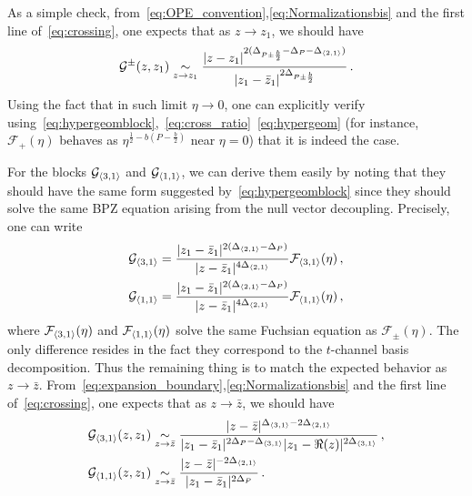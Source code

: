 \documentclass[a4paper]{article}
\begin{document}
As a simple check, from~\eqref{eq:OPE_convention},\eqref{eq:Normalizationsbis} and the first line of~\eqref{eq:crossing}, one expects that as $z \to z_1$, we should have
\begin{equation}
  \mathcal{G}^{\pm}(z,z_1) \underset{z \to z_1}{\sim} \frac{|z-z_1|^{2(\Delta_{P\pm\frac{b}{2}}-\Delta_P -\Delta_{\braket{2,1}})}}{|z_1-\bar{z}_1|^{2\Delta_{P\pm\frac{b}{2}}}}\,.
\end{equation}
Using the fact that in such limit $\eta \to 0$, one can explicitly verify using~\eqref{eq:hypergeomblock},~\eqref{eq:cross_ratio}~\eqref{eq:hypergeom} (for instance, $\mathcal{F}_+(\eta)$ behaves as $\eta^{\frac{1}{2}-b\left(P-\frac{b}{2}\right)}$ near $\eta =0$) that it is indeed the case.

For the blocks $\mathcal{G}_{\braket{3,1}}$ and $\mathcal{G}_{\braket{1,1}}$, we can derive them easily by noting that they should have the same form suggested by~\eqref{eq:hypergeomblock} since they should solve the same BPZ equation arising from the null vector decoupling. Precisely, one can  write
\begin{equation}
  \begin{aligned}
    \mathcal{G}_{\braket{3,1}} &= \frac{|z_1-\bar{z}_1|^{2(\Delta_{\braket{2,1}}-\Delta_{P})}}{|z-\bar{z}_1|^{4\Delta_{\braket{2,1}}}} \mathcal{F}_{\braket{3,1}}(\eta)\,,\\
    \mathcal{G}_{\braket{1,1}} &= \frac{|z_1-\bar{z}_1|^{2(\Delta_{\braket{2,1}}-\Delta_{P})}}{|z-\bar{z}_1|^{4\Delta_{\braket{2,1}}}} \mathcal{F}_{\braket{1,1}}(\eta)\,,
  \end{aligned}
\end{equation}
where $\mathcal{F}_{\braket{3,1}}(\eta)$ and $\mathcal{F}_{\braket{1,1}}(\eta)$ solve the same Fuchsian equation as $\mathcal{F}_{\pm}(\eta)$. The only difference resides in the fact they correspond to the $t$-channel basis decomposition. Thus the remaining thing is to match the expected behavior as $z \to \bar{z}$. From~\eqref{eq:expansion_boundary},\eqref{eq:Normalizationsbis} and the first line of~\eqref{eq:crossing}, one expects that as $z \to \bar{z}$, we should have
\begin{equation}
  \begin{aligned}
    \mathcal{G}_{\braket{3,1}}(z,z_1) &\underset{z \to \bar{z}}{\sim} \frac{|z-\bar{z}|^{\Delta_{\braket{3,1}}-2\Delta_{\braket{2,1}}}}{|z_1-\bar{z}_1|^{2\Delta_P - \Delta_{\braket{3,1}}}|z_1-\Re(z)|^{2\Delta_{\braket{3,1}}}}\,,\\
    \mathcal{G}_{\braket{1,1}}(z,z_1) &\underset{z \to \bar{z}}{\sim} \frac{|z-\bar{z}|^{-2\Delta_{\braket{2,1}}}}{|z_1-\bar{z}_1|^{2\Delta_P}}\,.
  \end{aligned}
\end{equation}
\end{document}
